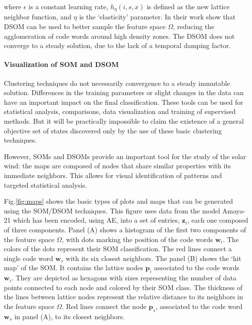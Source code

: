 where $\epsilon$ is a constant learning rate, $h_\eta(i,s,x)$ is defined as the new lattice neighbor function, and $\eta$ is the `elasticity' parameter. In their work \citep{Rougier2011} show that DSOM can be used to better sample the feature space $\Omega$, reducing the agglomeration of code words around high density zones. The DSOM does not converge to a steady solution, due to the lack of a temporal damping factor.

\paragraph{Visualization of SOM and DSOM}
Clustering techniques do not necessarily convergence to a steady immutable solution. Differences in the training parameters or slight changes in the data can have an important impact on the final classification. These tools can be used for statistical analysis, comparisons, data visualization and training of supervised methods. But it will be practically impossible to claim the existence of a general objective set of states discovered only by the use of these basic clustering techniques.

However, SOMs and DSOMs provide an important tool for the study of the solar wind: the maps are composed of nodes that share similar properties with its immediate neighbors. This allows for visual identification of patterns and targeted statistical analysis.

Fig.\ref{fig:maps} shows the basic types of plots and maps that can be generated using the SOM/DSOM techniques. This figure uses data from the model Amaya-21 which has been encoded, using AE, into a set of entries, $\boldsymbol{z}_i$, each one composed of three components. Panel (A) shows a histogram of the first two components of the feature space $\Omega$, with dots marking the position of the code words $\boldsymbol{w}_i$. The colors of the dots represent their SOM classification. The red lines connect a single code word $\boldsymbol{w}_s$ with its six closest neighbors. The panel (B) shows the `hit map' of the SOM. It contains the lattice nodes $\boldsymbol{p}_i$ associated to the code words $\boldsymbol{w}_i$. They are depicted as hexagons with sizes representing the number of data points connected to each node and colored by their SOM class. The thickness of the lines between lattice nodes represent the relative distance to its neighbors in the feature space $\Omega$. Red lines connect the node $\boldsymbol{p}_s$, associated to the code word $\boldsymbol{w}_s$ in panel (A), to its closest neighbors.

